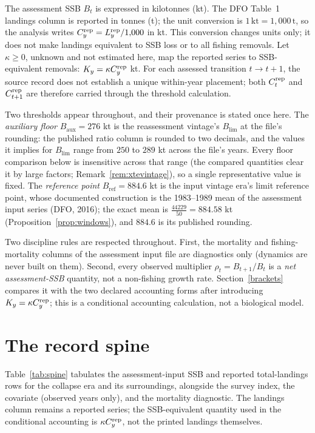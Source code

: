 \documentclass[10pt,twocolumn]{article}
\theoremstyle{plain}
\theoremstyle{remark}
\begin{document}
The assessment SSB \(B_t\) is expressed in kilotonnes (kt). The DFO
Table~1 landings column is reported in tonnes (t); the unit conversion is
\(1\,\mathrm{kt}=1{,}000\,\mathrm{t}\), so the analysis writes
\(C_y^{\rm rep}=L_y^{\rm rep}/1{,}000\) in kt. This conversion changes
units only; it does not make landings equivalent to SSB loss or to all
fishing removals. Let \(\kappa\ge0\), unknown and not estimated here,
map the reported series to SSB-equivalent removals:
\(K_y=\kappa C_y^{\rm rep}\) kt. For each assessed transition
\(t\to t+1\), the source record does not establish a unique within-year
placement; both \(C_t^{\rm rep}\) and \(C_{t+1}^{\rm rep}\) are therefore
carried through the threshold calculation.

Two thresholds appear throughout, and their provenance is stated once
here. The \emph{auxiliary floor} \(B_{\mathrm{aux}} = 276\) kt is the
reassessment vintage's \(B_{\mathrm{lim}}\) at the file's rounding: the
published ratio column is rounded to two decimals, and the values it
implies for \(B_{\mathrm{lim}}\) range from \(250\) to \(289\) kt
across the file's years. Every floor comparison below is insensitive
across that range (the compared quantities clear it by large factors;
Remark~\ref{rem:xtevintage}), so a single representative value is
fixed. The \emph{reference point} \(B_{\mathrm{ref}} = 884.6\) kt is
the input vintage era's limit reference point, whose documented
construction is the 1983--1989 mean of the assessment input series
(DFO, 2016); the exact mean is
\(\tfrac{44229}{50} = 884.58\) kt (Proposition~\ref{prop:windows}),
and \(884.6\) is its published rounding.

Two discipline rules are respected throughout. First, the mortality
and fishing-mortality columns of the assessment input file are
diagnostics only (dynamics are never built on them). Second, every
observed multiplier \(\rho_t=B_{t+1}/B_t\) is a \emph{net assessment-SSB}
quantity, not a non-fishing growth rate. Section~\ref{brackets}
compares it with the two declared accounting forms after introducing
\(K_y=\kappa C_y^{\rm rep}\); this is a conditional accounting
calculation, not a biological model.

\section{The record spine}\label{spine}

Table~\ref{tab:spine} tabulates the assessment-input SSB and reported
total-landings rows for the collapse era and its surroundings, alongside
the survey index, the covariate (observed years only), and the mortality
diagnostic. The landings column remains a reported series; the
SSB-equivalent quantity used in the conditional accounting is
\(\kappa C_y^{\rm rep}\), not the printed landings themselves.
\end{document}
